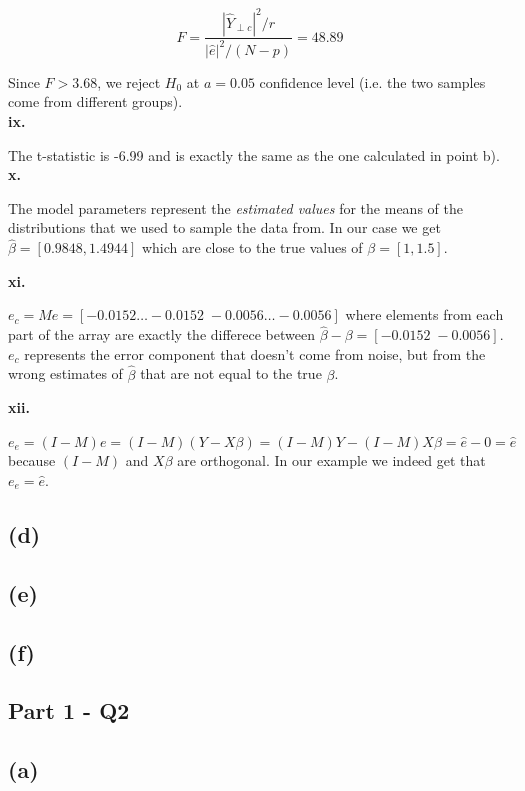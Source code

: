 \documentclass[12pt,a4paper,oneside]{report}
\begin{document}
$$F = \frac{|\hat{Y}_{\perp c}|^2 / r}{|\hat{e}|^2 / (N - p)} = 48.89$$

Since $F > 3.68$, we reject $H_0$ at $a = 0.05$ confidence level (i.e. the two samples come from different groups).\\

\textbf{ix.}

The t-statistic is -6.99 and is exactly the same as the one calculated in point b). \\

\textbf{x. }

The model parameters represent the \emph{estimated values} for the means of the distributions that we used to sample the data from. In our case we get $\hat{\beta} = [0.9848, 1.4944]$ which are close to the true values of $\beta = [1, 1.5]$.

\textbf{xi. }

$e_c = M e = [-0.0152 \dots -0.0152 \; -0.0056 \dots -0.0056 ]$ where elements from each part of the array are exactly the differece between $\hat{\beta} - \beta = [-0.0152 \; -0.0056]$. $e_c$ represents the error component that doesn't come from noise, but from the wrong estimates of $\hat{\beta}$ that are not equal to the true $\beta$.

\textbf{xii. }

$e_e = (I - M) e = (I - M) (Y - X\beta) = (I - M)Y - (I - M)X\beta = \hat{e} - 0 = \hat{e}$ because $(I-M)$ and $X\beta$ are orthogonal. In our example we indeed get that $e_e = \hat{e}$.


\subsection*{(d)}



\subsection*{(e)}

\subsection*{(f)}

\subsection*{Part 1 - Q2}

\subsection*{(a)}
\end{document}
